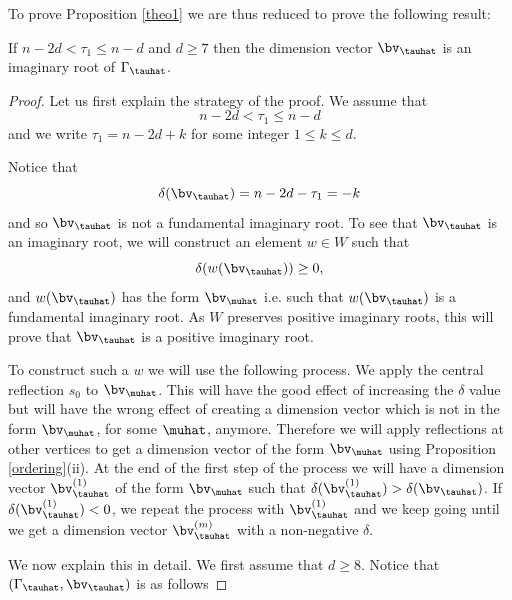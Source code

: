 To prove Proposition \ref{theo1} we are thus reduced to prove the following result:

\begin{prop}If $n-2d<\tau_1\leq n-d$  and $d\geq 7$ then the dimension vector $\bv_\tauhat$ is an imaginary root of $\Gamma_\tauhat$.
	\label{theo1'}\end{prop}


\begin{proof}Let us first explain the strategy of the proof. We assume that
	$$
	n-2d< \tau_1\leq n-d
	$$
	and we write $\tau_1=n-2d+k$ for some integer $1\leq k\leq d$. 

	Notice that 
	$$
	\delta(\bv_\tauhat)=n-2d-\tau_1=-k
	$$
	and so $\bv_\tauhat$ is not a fundamental imaginary root. To see that $\bv_\tauhat$ is an imaginary root, we will construct an element $w\in W$ such that 
	$$
	\delta(w(\bv_\tauhat))\geq 0,
	$$
	and $w(\bv_\tauhat)$ has the form $\bv_\muhat$ i.e. such that $w(\bv_\tauhat)$ is a fundamental imaginary root. As $W$ preserves positive imaginary roots, this will prove that $\bv_\tauhat$ is a positive  imaginary root.
	
	To construct such a $w$ we will use the following process. We apply the central reflection $s_0$ to $\bv_\muhat$. This will have the good effect of increasing the $\delta$ value but will have the wrong effect of creating a dimension vector which is not in the form $\bv_\muhat$, for some $\muhat$, anymore. Therefore we will apply reflections at other vertices to get a dimension vector of the form $\bv_\muhat$ using Proposition \ref{ordering}(ii). At the end of the first step of the process we will have a dimension vector $\bv_\tauhat^{(1)}$ of the form $\bv_\muhat$ such that $\delta(\bv_\tauhat^{(1)})>\delta(\bv_\tauhat)$. If $\delta(\bv_\tauhat^{(1)})<0$, we repeat the process with $\bv_\tauhat^{(1)}$ and we keep going  until we get a dimension vector $\bv_\tauhat^{(m)}$ with a non-negative $\delta$.
	
	We now explain this in detail. We first assume that $d\geq 8$. Notice that $(\Gamma_\tauhat,\bv_\tauhat)$ is as follows
	

\end{proof}
